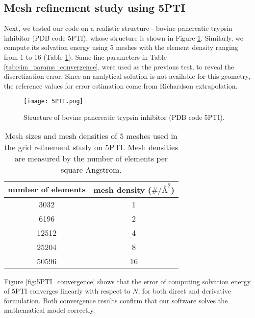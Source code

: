 \subsection{Mesh refinement study using 5PTI}

Next, we tested our code on a realistic structure - bovine pancreatic trypsin inhibitor (PDB code 5PTI), whose structure \cite{wlodawer1984structure} is shown in Figure \ref{fig:5PTI_structure}.
Similarly, we compute its solvation energy using 5 meshes with the element density ranging from 1 to 16 (Table \ref{tab:5PTI_mesh}).
Same fine parameters in Table \ref{tab:sim_params_convergence}, were used as the previous test, to reveal the discretization error.
Since an analytical solution is not available for this geometry, the reference values for error estimation come from Richardson extrapolation.

\begin{figure}%
    \centering
    \texttt{[image: 5PTI.png]}
    \caption{Structure of bovine pancreatic trypsin inhibitor (PDB code 5PTI).}
    \label{fig:5PTI_structure}
\end{figure}

\begin{table}[]
    \centering
    \begin{tabular}{cc}
    number of elements & mesh density ($\#/{\si{\angstrom}}^2$) \\
    \hline
    3032               & 1                                       \\
    6196               & 2                                       \\
    12512              & 4                                       \\
    25204              & 8                                       \\
    50596              & 16                                     
    \end{tabular}
    \caption{Mesh sizes and mesh densities of 5 meshes used in the grid refinement study on 5PTI. Mesh densities are measured by the number of elements per square Angstrom.}
    \label{tab:5PTI_mesh}
\end{table}

Figure \ref{fig:5PTI_convergence} shows that the error of computing solvation energy of 5PTI converges linearly with respect to $N$, for both direct and derivative formulation.
Both convergence results confirm that our software solves the mathematical model correctly.

